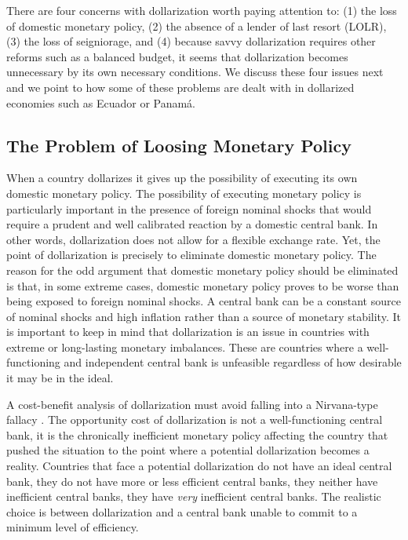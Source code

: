\documentclass[12pt]{article}
\begin{document}
There are four concerns with dollarization worth paying attention to: (1) the loss of domestic monetary policy, (2) the absence of a lender of last resort (LOLR), (3) the loss of seigniorage, and (4) because savvy dollarization requires other reforms such as a balanced budget, it seems that dollarization becomes unnecessary by its own necessary conditions. We discuss these four issues next and we point to how some of these problems are dealt with in dollarized economies such as Ecuador or Panamá.

\subsection{The Problem of Loosing Monetary Policy}

When a country dollarizes it gives up the possibility of executing its own domestic monetary policy. The possibility of executing monetary policy is particularly important in the presence of foreign nominal shocks that would require a prudent and well calibrated reaction by a domestic central bank. In other words, dollarization does not allow for a flexible exchange rate. Yet, the point of dollarization is precisely to eliminate domestic monetary policy. The reason for the odd argument that domestic monetary policy should be eliminated is that, in some extreme cases, domestic monetary policy proves to be worse than being exposed to foreign nominal shocks. A central bank can be a constant source of nominal shocks and high inflation rather than a source of monetary stability. It is important to keep in mind that dollarization is an issue in countries with extreme or long-lasting monetary imbalances. These are countries where a well-functioning and independent central bank is unfeasible regardless of how desirable it may be in the ideal.

A cost-benefit analysis of dollarization must avoid falling into a Nirvana-type fallacy \parencite{Demsetz1969}. The opportunity cost of dollarization is not a well-functioning central bank, it is the chronically inefficient monetary policy affecting the country that pushed the situation to the point where a potential dollarization becomes a reality. Countries that face a potential dollarization do not have an ideal central bank, they do not have more or less efficient central banks, they neither have inefficient central banks, they have \textit{very} inefficient central banks. The realistic choice is between dollarization and a central bank unable to commit to a minimum level of efficiency.
\end{document}
